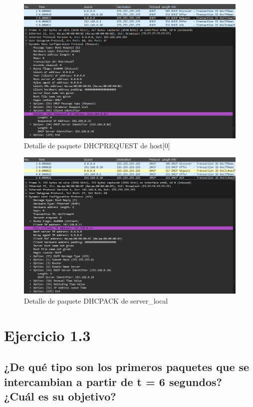 \begin{figure}[H]
    \centering
    \includegraphics[width=135mm, scale=0.75]{imaxes/ejercicio1_3_1.png}
    \caption{Detalle de paquete DHCPREQUEST de host[0]}
    \label{fig:DHCPREQUEST_host0}
\end{figure}
\begin{figure}[H]
    \centering
    \includegraphics[width=135mm, scale=0.75]{imaxes/ejercicio1_3_2.png}
    \caption{Detalle de paquete DHCPACK de server\_local}
    \label{fig:DHCPACK_host0}
\end{figure}

\section{Ejercicio 1.3}

\subsection{¿De qué tipo son los primeros paquetes que se intercambian a partir de t = 6 segundos? ¿Cuál es su objetivo?}

